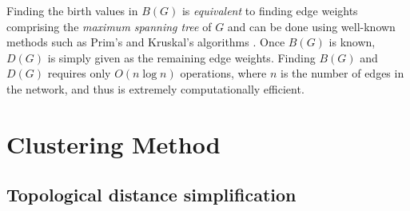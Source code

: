 \documentclass{article} %
\begin{document}
Finding the birth values in $B(G)$ is {\em equivalent} to finding edge weights comprising the {\em maximum spanning tree} of $G$ and can be done using well-known methods such as Prim's and Kruskal's algorithms \citep{lee2012persistent}. Once $B(G)$ is known, $D(G)$ is simply given as the remaining edge weights. Finding $B(G)$ and $D(G)$ requires only $O(n\log n)$ operations, where $n$ is the number of edges in the network, and thus is extremely computationally efficient.



\section{Clustering Method}
\label{sec:method}

\subsection{Topological distance simplification}
\end{document}
